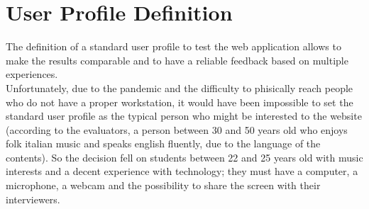 \documentclass[../../UsabilityReport.tex]{subfiles}
\begin{document}
\section{User Profile Definition}
	The definition of a standard user profile to test the web application allows to make the results comparable and to have a reliable feedback based on multiple experiences.\\
	Unfortunately, due to the pandemic and the difficulty to phisically reach people who do not have a proper workstation, it would have been impossible to set the standard user profile as the typical person who might be interested to the website (according to the evaluators, a person between 30 and 50 years old who enjoys folk italian music and speaks english fluently, due to the language of the contents). So the decision fell on students between 22 and 25 years old with music interests and a decent experience with technology; they must have a computer, a microphone, a webcam and the possibility to share the screen with their interviewers.
\end{document}
